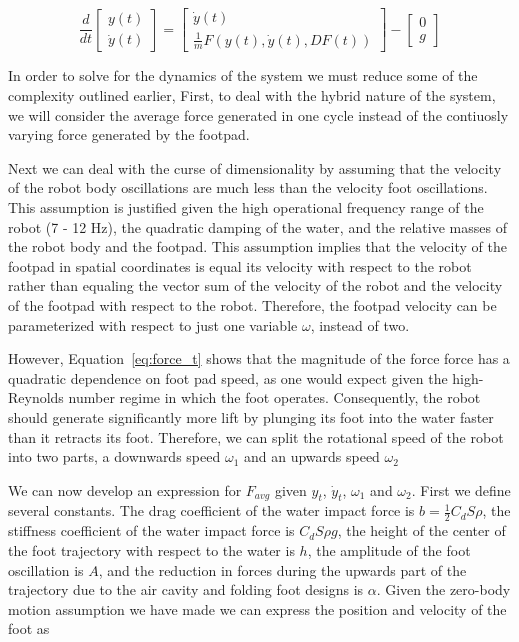 \begin{equation}
	\frac{d}{dt} \begin{bmatrix} y(t) \\ \dot{y}(t) \end{bmatrix} = \begin{bmatrix} \dot{y}(t) \\ \frac{1}{m} F(y(t),\dot{y}(t), DF(t)) \end{bmatrix} - \begin{bmatrix} 0 \\ g \end{bmatrix}
	\label{eq:eom}
\end{equation}

In order to solve for the dynamics of the system we must reduce some of the complexity outlined earlier, First, to deal with the hybrid nature of the system, we will consider the average force generated in one cycle instead of the contiuosly varying force generated by the footpad. 

Next we can deal with the curse of dimensionality by assuming that the velocity of the robot body oscillations are much less than the velocity foot oscillations. This assumption is justified given the high operational frequency range of the robot (7 - 12 Hz), the quadratic damping of the water, and the relative masses of the robot body and the footpad. This assumption implies that the velocity of the footpad in spatial coordinates is equal its velocity with respect to the robot rather than equaling the vector sum of the velocity of the robot and the velocity of the footpad with respect to the robot. Therefore, the footpad velocity can be parameterized with respect to just one variable $\omega$, instead of two.

However, Equation~\ref{eq:force_t} shows that the magnitude of the force force has a quadratic dependence on foot pad speed, as one would expect given the high-Reynolds number regime in which the foot operates. Consequently, the robot should generate significantly more lift by plunging its foot into the water faster than it retracts its foot. Therefore, we can split the rotational speed of the robot into two parts, a downwards speed $\omega_1$ and an upwards speed $\omega_2$

We can now develop an expression for $F_{avg}$ given $y_t$, $\dot{y}_t$, $\omega_1$ and $\omega_2$. First we define several constants. The drag coefficient of the water impact force is $b = \frac{1}{2} C_d S \rho$, the stiffness coefficient of the water impact force is $C_d S \rho g$, the height of the center of the foot trajectory with respect to the water is $h$, the amplitude of the foot oscillation is $A$, and the reduction in forces during the upwards part of the trajectory due to the air cavity and folding foot designs is $\alpha$. Given the zero-body motion assumption we have made we can express the position and velocity of the foot as


